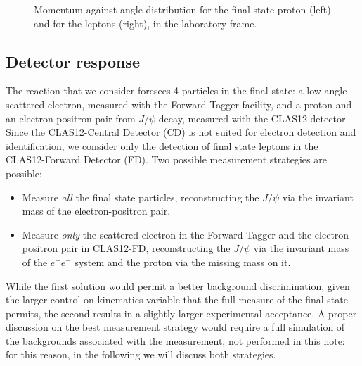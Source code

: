 \begin{figure}[tpb]
\caption{\footnotesize \label{fig:2} Momentum-against-angle distribution for the final state proton (left) and for the leptons (right), in the laboratory frame.}
\end{figure}




\subsection{Detector response}

The reaction that we consider foresees 4 particles in the final state: a low-angle scattered electron, measured with the Forward Tagger facility, and a proton and an electron-positron pair from $J/\psi$ decay, measured with the CLAS12 detector. Since the CLAS12-Central Detector (CD) is not suited for electron detection and identification, we consider only the detection of final state leptons in the CLAS12-Forward Detector (FD). Two possible measurement strategies are possible:
\begin{itemize}
\item{Measure \textit{all} the final state particles, reconstructing the $J/\psi$ via the invariant mass of the electron-positron pair.}
\item{Measure \textit{only} the scattered electron in the Forward Tagger and the electron-positron pair in CLAS12-FD, reconstructing the $J/\psi$ via the invariant mass of the $e^{+} e^{-}$ system and the proton via the missing mass on it.}
\end{itemize} 
While the first solution would permit a better background discrimination, given the larger control on kinematics variable that the full measure of the final state permits, the second results in a slightly larger experimental acceptance. A proper discussion on the best measurement strategy would require a full simulation of the backgrounds associated with the measurement, not performed in this note: for this reason, in the following we will discuss both strategies. 

